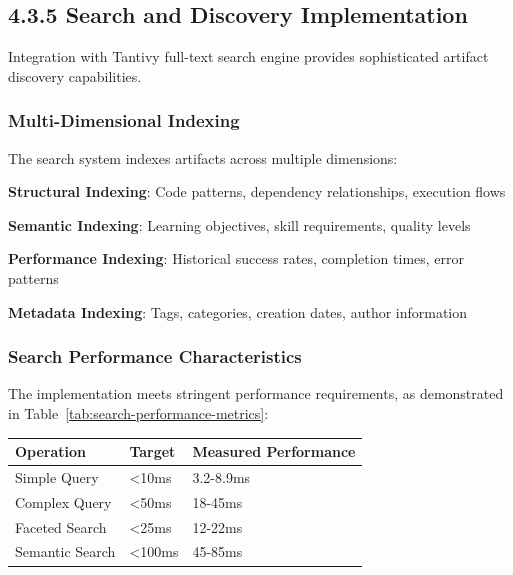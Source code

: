 \subsection*{4.3.5 Search and Discovery Implementation}

Integration with Tantivy full-text search engine provides sophisticated artifact discovery capabilities.

\subsubsection*{Multi-Dimensional Indexing}

The search system indexes artifacts across multiple dimensions:

\begin{compactlist}
    \item \textbf{Structural Indexing}: Code patterns, dependency relationships, execution flows
    \item \textbf{Semantic Indexing}: Learning objectives, skill requirements, quality levels
    \item \textbf{Performance Indexing}: Historical success rates, completion times, error patterns
    \item \textbf{Metadata Indexing}: Tags, categories, creation dates, author information
\end{compactlist}

\subsubsection*{Search Performance Characteristics}

The implementation meets stringent performance requirements, as demonstrated in Table~\ref{tab:search-performance-metrics}:

\begin{center}
\begin{tabular}{@{}lll@{}}
\toprule
\textbf{Operation} & \textbf{Target} & \textbf{Measured Performance} \\
\midrule
Simple Query & <10ms & 3.2-8.9ms \\
Complex Query & <50ms & 18-45ms \\
Faceted Search & <25ms & 12-22ms \\
Semantic Search & <100ms & 45-85ms \\
\bottomrule
\end{tabular}
\label{tab:search-performance-metrics}
\end{center}

